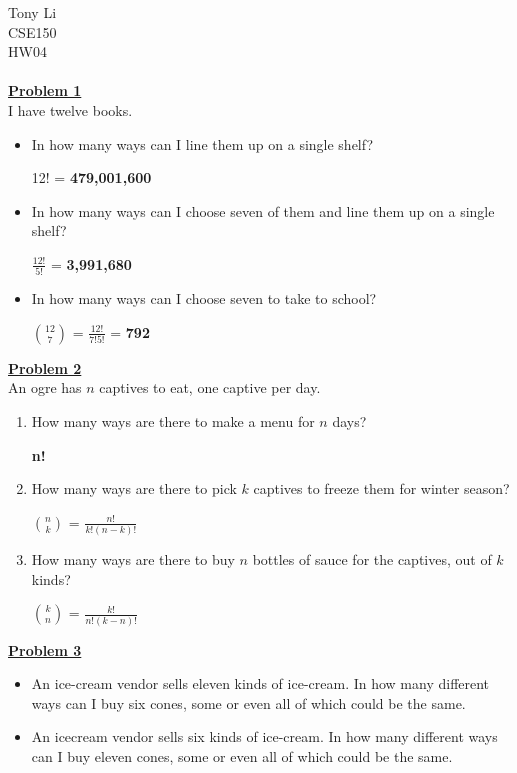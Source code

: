 \documentclass[11pt]{article}
\begin{document}
\noindent 
Tony Li \\
CSE150 \\
HW04 \\\\

\noindent\textbf{\underline{Problem 1}}\\

I have twelve books.

	\begin{itemize}
		\item In how many ways can I line them up on a single shelf?

		12! = \textbf{479,001,600}

		\item In how many ways can I choose seven of them and line them up on a single shelf?
		
		$\frac{12!}{5!}$ = \textbf{3,991,680}

		\item In how many ways can I choose seven to take to school?

		${12 \choose 7}$ = $\frac{12!}{7!5!}$ = \textbf{792}
	\end{itemize}

\noindent\textbf{\underline{Problem 2}}\\

An ogre has $n$ captives to eat, one captive per day.

	\begin{enumerate}
		\item How many ways are there to make a menu for $n$ days?

		\textbf{n!}

		\item How many ways are there to pick $k$ captives to freeze them for winter season?

		${n \choose k}$ = $\frac{n!}{k!(n-k)!}$

		\item How many ways are there to buy $n$ bottles of sauce for the captives, out of $k$ kinds?

		${k \choose n}$ = $\frac{k!}{n!(k-n)!}$
	\end{enumerate}

\noindent\textbf{\underline{Problem 3}}\\

	\begin{itemize}
		\item An ice-cream vendor sells eleven kinds of ice-cream. In how many different ways can I buy 
		six cones, some or even all of which could be the same.

		

		\item An icecream vendor sells six kinds of ice-cream. In how many different ways can I buy
		eleven cones, some or even all of which could be the same.

		
	\end{itemize}
\end{document}
